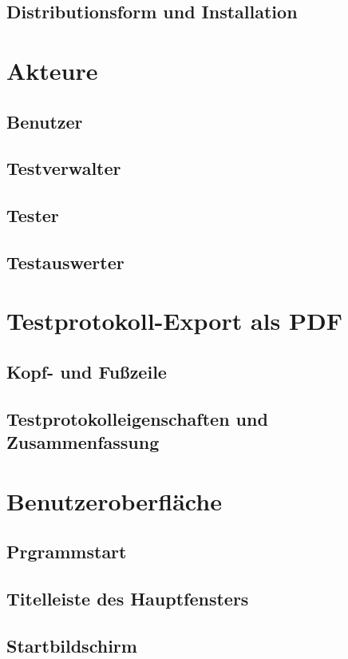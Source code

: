 \documentclass[a4paper,10pt]{scrartcl}
\begin{document}
\subsection{Distributionsform und Installation}

\section{Akteure}
\subsection{Benutzer}
\subsection{Testverwalter}
\subsection{Tester}
\subsection{Testauswerter}

\section{Testprotokoll-Export als PDF}
\subsection{Kopf- und Fußzeile}
\subsection{Testprotokolleigenschaften und Zusammenfassung}

\section{Benutzeroberfläche}
\subsection{Prgrammstart}
\subsection{Titelleiste des Hauptfensters}
\subsection{Startbildschirm}
\end{document}
